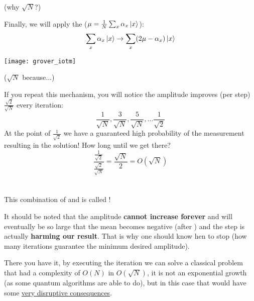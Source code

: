 \documentclass[aspectratio=43]{beamer}
\begin{document}
\begin{frame}{\gvsa (why $\sqrt{N}$?)}
    \begin{cardTiny}
        Finally, we will apply the \iatm ($\mu = \frac{1}{N}\sum_x \alpha_x \ket{x}$):
        \begin{equation*}
            \sum_x \alpha_x \ket{x} \rightarrow \sum_x (2\mu - \alpha_x) \ket{x}
        \end{equation*}
        \begin{center}
            \texttt{[image: grover\_iotm]}
        \end{center}
    \end{cardTiny}
\pagenumber
\end{frame}

\newcommand{\amp}[2]{\frac{#1}{\sqrt{#2}}}
\begin{frame}{\gvsa ($\sqrt{N}$ because...)}
    \begin{card}
        If you repeat this mechanism, you will notice the amplitude improves (per step) $\amp{\sqrt{2}}{N}$ every iteration:
        \begin{equation*}
            \amp{1}{N}, \amp{3}{N}, \amp{5}{N}, ... \amp{1}{2}
        \end{equation*}
        At the point of $\amp{1}{2}$ we have a guaranteed high probability of the measurement resulting in the solution! How long until we get there?
        \begin{equation*}
            \frac{\amp{1}{2}}{\amp{\sqrt{2}}{N}} = \frac{\sqrt{N}}{2} = O(\sqrt{N})
        \end{equation*}
    \end{card}
\pagenumber
\end{frame}

\section{\aamp}
\begin{frame}{\aamp}
    \begin{cardTiny}
        This combination of \phiv and \iatm is called \textbf{\aamp}!
    \end{cardTiny}
    \begin{cardTiny}
        \small{
        It should be noted that the amplitude \textbf{cannot increase forever} and will eventually be so large that the mean becomes negative (after \phiv) and the \iatm step is actually \textbf{harming our result}. That is why one should know hen to stop (how many iterations guarantee the minimum desired amplitude).}
    \end{cardTiny}
    \begin{cardTiny}
        There you have it, by executing the \aamp iteration we can solve a classical problem that had a complexity of $O(N)$ in $O(\sqrt{N})$, it is not an exponential growth (as some quantum algorithms are able to do), but in this case that would have some \href{https://en.wikipedia.org/wiki/P_versus_NP_problem}{very disruptive consequences}. 
    \end{cardTiny}
\pagenumber
\end{frame}
\end{document}

